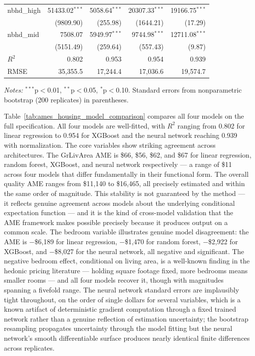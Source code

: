 \documentclass[12pt]{article}
\begin{document}
\begin{table}[htbp]
\begin{threeparttable}
\begin{tabular}{lrrrr}
				nbhd\_high & 51433.02$^{***}$ & 5058.64$^{***}$ & 20307.33$^{***}$ & 19166.75$^{***}$ \\
				& (9809.90) & (255.98) & (1644.21) & (17.29) \\
				nbhd\_mid & 7508.07 & 5949.97$^{***}$ & 9744.98$^{***}$ & 12711.08$^{***}$ \\
				& (5151.49) & (259.64) & (557.43) & (9.87) \\
				\midrule
				$R^2$ & 0.802 & 0.953 & 0.954 & 0.939 \\
				RMSE & 35,355.5 & 17,244.4 & 17,036.6 & 19,574.7 \\
				\bottomrule
			\end{tabular}
			\begin{tablenotes}
				\footnotesize
				\item \textit{Notes:} $^{***}$p$<$0.01, $^{**}$p$<$0.05, $^{*}$p$<$0.10. Standard errors from nonparametric bootstrap (200 replicates) in parentheses.
			\end{tablenotes}
		\end{threeparttable}
	\end{table}
	
	Table~\ref{tab:ames_housing_model_comparison} compares all four models on the full specification. All four models are well-fitted, with $R^2$ ranging from 0.802 for linear regression to 0.954 for XGBoost and the neural network reaching 0.939 with normalization. The core variables show striking agreement across architectures. The GrLivArea AME is \$66, \$56, \$62, and \$67 for linear regression, random forest, XGBoost, and neural network respectively --- a range of \$11 across four models that differ fundamentally in their functional form. The overall quality AME ranges from \$11,140 to \$16,465, all precisely estimated and within the same order of magnitude. This stability is not guaranteed by the method --- it reflects genuine agreement across models about the underlying conditional expectation function --- and it is the kind of cross-model validation that the AME framework makes possible precisely because it produces output on a common scale. The bedroom variable illustrates genuine model disagreement: the AME is $-$\$6,189 for linear regression, $-$\$1,470 for random forest, $-$\$2,922 for XGBoost, and $-$\$8,027 for the neural network, all negative and significant. The negative bedroom effect, conditional on living area, is a well-known finding in the hedonic pricing literature --- holding square footage fixed, more bedrooms means smaller rooms --- and all four models recover it, though with magnitudes spanning a fivefold range. The neural network standard errors are implausibly tight throughout, on the order of single dollars for several variables, which is a known artifact of deterministic gradient computation through a fixed trained network rather than a genuine reflection of estimation uncertainty; the bootstrap resampling propagates uncertainty through the model fitting but the neural network's smooth differentiable surface produces nearly identical finite differences across replicates.
	
\end{document}
